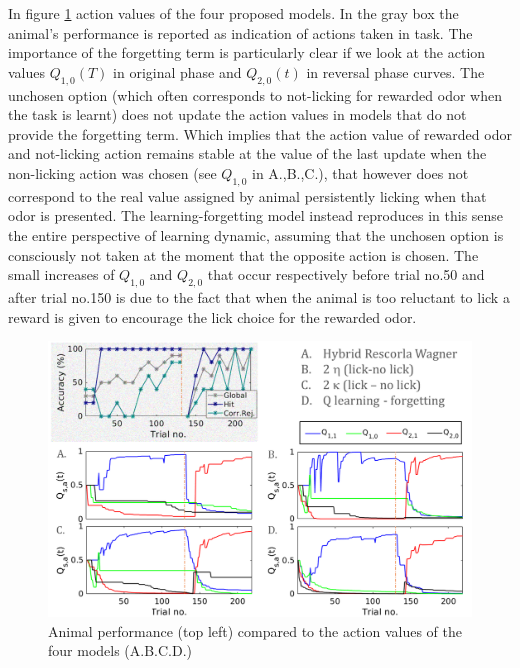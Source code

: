 In figure \ref{fig:4models} action values of the four proposed models. In the gray box the animal's performance is reported as indication of actions taken in task. The importance of the forgetting term is particularly clear if we look at the action values $Q_{1,0}(T)$ in original phase and $Q_{2,0}(t)$ in reversal phase curves. The unchosen option (which often corresponds to  not-licking for rewarded odor when the task is learnt) does not update the action values in models that do not provide the forgetting term. Which implies that the action value of rewarded odor and not-licking action remains stable at the value of the last update when the non-licking action was chosen (see $Q_{1,0}$ in A.,B.,C.), that however does not correspond to the real value assigned by animal persistently licking when that odor is presented. The learning-forgetting model instead reproduces in this sense the entire perspective of learning dynamic, assuming that the unchosen option is consciously not taken at the moment that the opposite action is chosen. The small increases of $Q_{1,0}$ and $Q_{2,0}$ that occur respectively before trial no.50 and after trial no.150 is due to the fact that when the animal is too reluctant to lick a reward is given to encourage the lick choice for the rewarded odor. 
\begin{figure}
    \centering
    \includegraphics[scale=0.75]{figures/Resume4models3.png}
    \caption{Animal performance (top left) compared to the action values of the four models (A.B.C.D.)}
    \label{fig:4models}
\end{figure}

